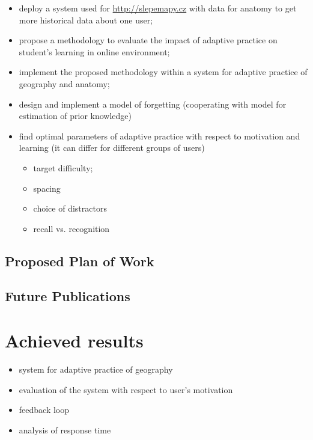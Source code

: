 \documentclass[table,color]{fithesis3/fithesis3}
\begin{document}
\begin{itemize}
	\item deploy a system used for \url{http://slepemapy.cz} with data for
		anatomy to get more historical data about one user;
	\item propose a methodology to evaluate the impact of adaptive practice on
		student's learning in online environment;
	\item implement the proposed methodology within a system for adaptive
		practice of geography and anatomy;
	\item design and implement a model of forgetting (cooperating with model for
		estimation of prior knowledge)
	\item find optimal parameters of adaptive practice with respect to motivation
		and learning (it can differ for different groups of users)
		\begin{itemize}
			\item target difficulty;
			\item spacing
			\item choice of distractors
			\item recall vs. recognition
		\end{itemize}
\end{itemize}

\section{Proposed Plan of Work}

\section{Future Publications}

\chapter{Achieved results}

\begin{itemize}
	\item system for adaptive practice of geography~\cite{papousek2014adaptive}
	\item evaluation of the system with respect to user's motivation~\cite{papousek2015impact}
	\item feedback loop~\cite{niznan2015exploring}
	\item analysis of response time~\cite{papousek2015analysis}
\end{itemize}



\end{document}
